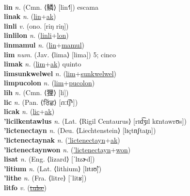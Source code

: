  \label{'liwla} \\
\textbf{lin} \textit{n.} (Cmn. ⟨鳞⟩ [lin˧˥])
escama \label{lin} \\
\textbf{linak} \textit{n.} (\hyperref[lin]{lin}+\hyperref[ak]{ak})
 \label{linak} \\
\textbf{linli} \textit{v.} (ono. [riŋ riŋ])
 \label{linli} \\
\textbf{linlilon} \textit{n.} (\hyperref[linli]{linli}+\hyperref[lon]{lon})
 \label{linlilon} \\
\textbf{linmamul} \textit{n.} (\hyperref[lin]{lin}+\hyperref[mamul]{mamul})
 \label{linmamul} \\
\textbf{lim} \textit{num.} (Jav. ⟨lima⟩ [lima])
5; cinco \label{lim} \\
\textbf{limak} \textit{n.} (\hyperref[lim]{lim}+\hyperref[ak]{ak})
quinto \label{limak} \\
\textbf{limsunkwelwel} \textit{n.} (\hyperref[lim]{lim}+\hyperref[sunkwelwel]{sunkwelwel})
 \label{limsunkwelwel} \\
\textbf{limpucolon} \textit{n.} (\hyperref[lim]{lim}+\hyperref[pucolon]{pucolon})
 \label{limpucolon} \\
\textbf{lih} \textit{n.} (Cmn. ⟨狸⟩ [li])
 \label{lih} \\
\textbf{lic} \textit{n.} (Pan. ⟨ਰਿੱਛ⟩ [ɾɪːt͡ʃʰ])
 \label{lic} \\
\textbf{licak} \textit{n.} (\hyperref[lic]{lic}+\hyperref[ak]{ak})
 \label{licak} \\
\textbf{'licilkentawlus} \textit{n.} (Lat. ⟨Rigil Centaurus⟩ [rɪd͡ʒɪl kɛntawrʊs])
 \label{'licilkentawlus} \\
\textbf{'lictenectayn} \textit{n.} (Deu. ⟨Liechtenstein⟩ [lɪçtn̩ʃtaɪ̯n])
 \label{'lictenectayn} \\
\textbf{'lictenectaynak} \textit{n.} (\hyperref['lictenectayn]{'lictenectayn}+\hyperref[ak]{ak})
 \label{'lictenectaynak} \\
\textbf{'lictenectaynwon} \textit{n.} (\hyperref['lictenectayn]{'lictenectayn}+\hyperref[won]{won})
 \label{'lictenectaynwon} \\
\textbf{lisat} \textit{n.} (Eng. ⟨lizard⟩ [ˈlɪzɚd])
 \label{lisat} \\
\textbf{'litium} \textit{n.} (Lat. ⟨lithium⟩ [lɪtɪʊ̃])
 \label{'litium} \\
\textbf{'lithe} \textit{n.} (Fra. ⟨litre⟩ [ˈlitʁ])
 \label{'lithe} \\
\textbf{litfo} \textit{v.} (\hyperref[tulse]{\sout{tulse}})
 \label{litfo} \\
